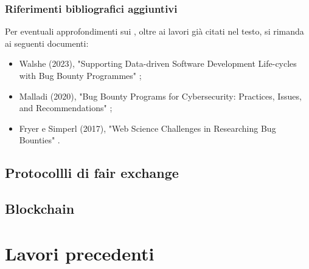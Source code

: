 \subsubsection{Riferimenti bibliografici aggiuntivi}

Per eventuali approfondimenti sui \BBP, oltre ai lavori già citati nel testo, si rimanda ai seguenti documenti: 
\begin{itemize}

\item Walshe (2023), "Supporting Data-driven Software Development Life-cycles with Bug Bounty Programmes" \cite{walshe2023bountythesis};

\item Malladi \etAl (2020), "Bug Bounty Programs for Cybersecurity: Practices, Issues, and Recommendations" \cite{malladi2020bugbounty};

\item Fryer e Simperl (2017), "Web Science Challenges in Researching Bug Bounties" \cite{fryer2017bugbounty}.

\end{itemize}


\subsection{Protocollli di fair exchange}

\subsection{Blockchain}




\section{Lavori precedenti}







